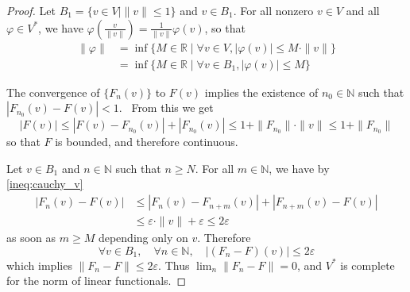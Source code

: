 \documentclass[11pt,a4paper,twoside]{article}
\theoremstyle{definition}
\begin{document}
\begin{proof}
  Let $B_1 = \{ v \in V \mid \| v \| \leq 1 \}$ and $v \in B_1$.
  For all nonzero $v \in V$ and all $\varphi \in V^*$, we have $\varphi ( \frac{v}{\| v \|} ) = \frac{1}{\| v \|} \varphi ( v )$, so that
  \begin{align*}
    \| \varphi \| &= \inf \{ M \in \mathbb{R} \mid \forall v \in V, | \varphi ( v ) | \leq M \cdot \| v \| \} \\
    &= \inf \{ M \in \mathbb{R} \mid \forall v \in B_1, | \varphi ( v ) | \leq M \}
  \end{align*}

  The convergence of $\{ F_n ( v ) \}$ to $F ( v )$ implies the existence of $n_0 \in \mathbb{N}$ such that $| F_{n_0} ( v ) - F ( v ) | < 1$. \
  From this we get
  \begin{equation*}
    | F ( v ) | \leq | F ( v ) - F_{n_0} ( v ) | + | F_{n_0} ( v ) | \leq 1 + \| F_{n_0} \| \cdot \| v \| \leq 1 + \| F_{n_0} \|
  \end{equation*}
  so that $F$ is bounded, and therefore continuous.

  Let $v \in B_1$ and $n \in \mathbb{N}$ such that $n \geq N$. For all $m \in \mathbb{N}$, we have by \eqref{ineq:cauchy_v}
  \begin{align*}
    | F_n ( v ) - F ( v ) | &\leq | F_n ( v ) - F_{n + m} ( v ) | + | F_{n + m} ( v ) - F ( v ) | \\
    &\leq \varepsilon \cdot \| v \| + \varepsilon \leq 2 \varepsilon
  \end{align*}
  as soon as $m \geq M$ depending only on $v$. Therefore
  \begin{equation*}
    \forall v \in B_1, \quad \forall n \in \mathbb{N}, \quad | ( F_n - F ) ( v ) | \leq 2 \varepsilon
  \end{equation*}
  which implies $\| F_n - F \| \leq 2 \varepsilon$. Thus $\lim_n \| F_n - F \| = 0$, and $V^*$ is complete for the
  norm of linear functionals.

\end{proof}
\end{document}
